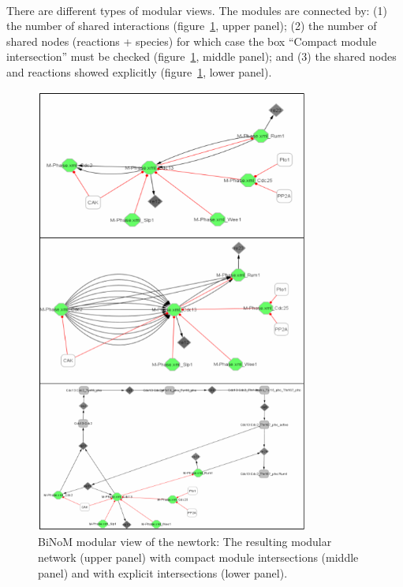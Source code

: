 \\There are different types of modular views. The modules are connected by: (1) the number of shared interactions (figure~\ref{Modular_view_The_resulting_modular_network}, upper panel); (2) the number of shared nodes (reactions + species) for which case the box “Compact module intersection” must be checked (figure~\ref{Modular_view_The_resulting_modular_network}, middle panel); and (3) the shared nodes and reactions showed explicitly (figure~\ref{Modular_view_The_resulting_modular_network}, lower panel).
\begin{figure}
\centering
\includegraphics[width=0.8\textwidth]{graphics/Modular_view_The_resulting_modular_network}
\caption{BiNoM modular view of the newtork: The resulting modular network (upper panel) with compact module intersections (middle panel) and with explicit intersections (lower panel).}
\label{Modular_view_The_resulting_modular_network}
\end{figure}

